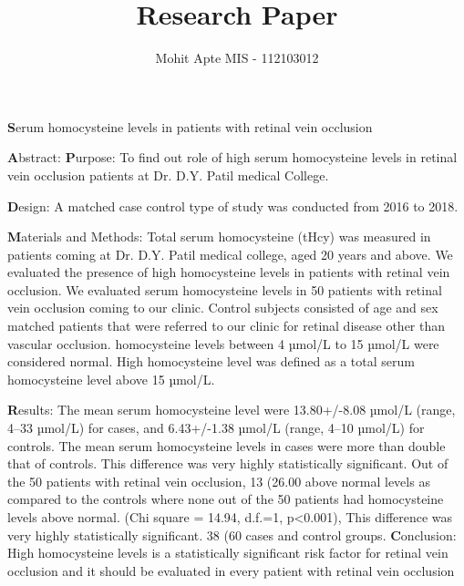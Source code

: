 \documentclass{article}
\title{Research Paper}
\author{Mohit Apte MIS - 112103012}
\begin{document}
\maketitle
\newpage
\begin{center}
\begin{large}
\textbf Serum homocysteine levels in patients with retinal vein occlusion

\end{large}
\end{center}
\hrulefill
\newline
\textbf Abstract:
\newline
\textbf Purpose: 
To find out role of high serum homocysteine levels in retinal vein occlusion patients at Dr. D.Y. Patil medical College.

\textbf Design: 
A matched case control type of study was conducted from 2016 to 2018.

\textbf Materials and Methods: 
Total serum homocysteine (tHcy) was measured in patients coming at Dr. D.Y. Patil medical college, aged 20
years and above. We evaluated the presence of high homocysteine levels in patients with retinal vein occlusion. We evaluated serum
homocysteine levels in 50 patients with retinal vein occlusion coming to our clinic. Control subjects consisted of age and sex matched
patients that were referred to our clinic for retinal disease other than vascular occlusion. homocysteine levels between 4 µmol/L to 15
µmol/L were considered normal. High homocysteine level was defined as a total serum homocysteine level above 15 µmol/L.

\textbf Results: 
The mean serum homocysteine level were 13.80+/-8.08 µmol/L (range, 4–33 µmol/L) for cases, and 6.43+/-1.38 µmol/L (range,
4–10 µmol/L) for controls. The mean serum homocysteine levels in cases were more than double that of controls. This difference was very
highly statistically significant. Out of the 50 patients with retinal vein occlusion, 13 (26.00%
above normal levels as compared to the controls where none out of the 50 patients had homocysteine levels above normal. (Chi square =
14.94, d.f.=1, p<0.001), This difference was very highly statistically significant. 38 (60%
cases and control groups.
\textbf Conclusion: 
High homocysteine levels is a statistically significant risk factor for retinal vein occlusion and it should be evaluated in every
patient with retinal vein occlusion
\end{document}
